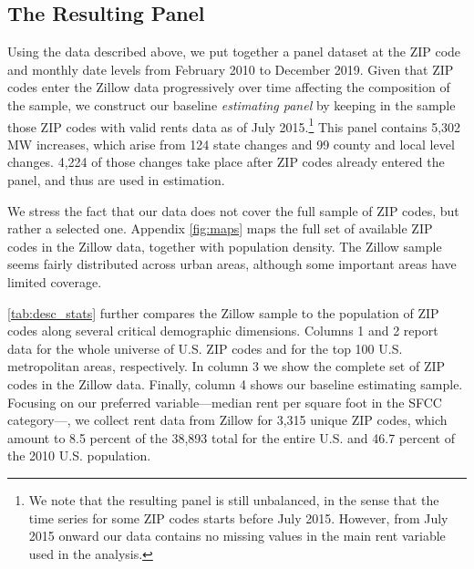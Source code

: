 
\subsection{The Resulting Panel}\label{sec:data_final_panel}

Using the data described above, we put together a panel dataset at the ZIP code and monthly 
date levels from February 2010 to December 2019. Given that ZIP codes enter the Zillow data 
progressively over time affecting the composition of the sample, we construct our baseline 
\textit{estimating panel} by keeping in the sample those ZIP codes with valid rents data as 
of July 2015.\footnote{We note that the resulting panel is still unbalanced, in the sense 
	that the time series for some ZIP codes starts before July 2015. However, from July
	2015 onward our data contains no missing values in the main rent variable used in the 
	analysis.} 
This panel contains 5,302 MW increases, which arise from 124 state changes and 99 county 
and local level changes. 4,224 of those changes take place after ZIP codes already entered
the panel, and thus are used in estimation.

We stress the fact that our data does not cover the full sample of ZIP codes, but rather 
a selected one. Appendix \autoref{fig:maps} maps the full set of available ZIP codes in 
the Zillow data, together with population density. The Zillow sample seems fairly 
distributed across urban areas, although some important areas have limited coverage. 

\autoref{tab:desc_stats} further compares the Zillow sample to the population of ZIP codes 
along several critical demographic dimensions. Columns 1 and 2 report data for the whole 
universe of U.S. ZIP codes and for the top 100 U.S. metropolitan areas, respectively. In 
column 3 we show the complete set of ZIP codes in the Zillow data. Finally, column 4 shows 
our baseline estimating sample. Focusing on our preferred variable---median rent per square 
foot in the SFCC category---, we collect rent data from Zillow for 3,315 unique ZIP codes, 
which amount to 8.5 percent of the 38,893 total for the entire U.S. and 46.7 percent 
of the 2010 U.S. population. 

